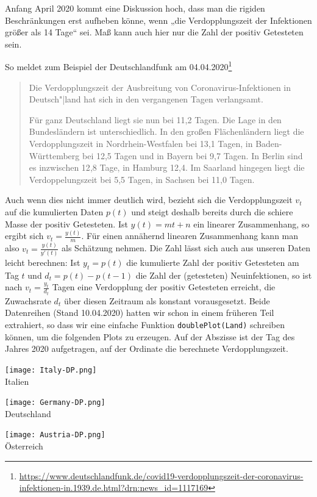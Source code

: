\documentclass[a4paper,11pt]{article}
\begin{document}
Anfang April 2020 kommt eine Diskussion hoch, dass man die rigiden
Beschränkungen erst aufheben könne, wenn „die Verdopplungszeit der Infektionen
größer als 14 Tage“ sei.  Maß kann auch hier nur die Zahl der positiv
Getesteten sein. 

So meldet zum Beispiel der Deutschlandfunk am 04.04.2020\footnote{\raggedright
  \url{https://www.deutschlandfunk.de/covid19-verdopplungszeit-der-coronavirus-infektionen-in.1939.de.html?drn:news_id=1117169}}
\begin{quote}
  Die Verdopplungszeit der Ausbreitung von Coronavirus-Infektionen in
  Deutsch"|land hat sich in den vergangenen Tagen verlangsamt.

  Für ganz Deutschland liegt sie nun bei 11{,}2 Tagen. Die Lage in den
  Bundesländern ist unterschiedlich. In den großen Flächenländern liegt die
  Verdopplungszeit in Nordrhein-Westfalen bei 13{,}1 Tagen, in
  Baden-Württemberg bei 12{,}5 Tagen und in Bayern bei 9{,}7 Tagen. In Berlin
  sind es inzwischen 12{,}8 Tage, in Hamburg 12{,}4. Im Saarland hingegen
  liegt die Verdoppelungszeit bei 5{,}5 Tagen, in Sachsen bei 11{,}0 Tagen.
\end{quote}
Auch wenn dies nicht immer deutlich wird, bezieht sich die Verdopplungszeit
$v_t$ auf die kumulierten Daten $p(t)$ und steigt deshalb bereits durch die
schiere Masse der positiv Getesteten.  Ist $y(t)=mt+n$ ein linearer
Zusammenhang, so ergibt sich $v_t=\frac{y(t)}{m}$. Für einen annähernd
linearen Zusammenhang kann man also $v_t=\frac{y(t)}{y'(t)}$ als Schätzung
nehmen.  Die Zahl lässt sich auch aus unseren Daten leicht berechnen: Ist
$y_t=p(t)$ die kumulierte Zahl der positiv Getesteten am Tag $t$ und
$d_t=p(t)-p(t-1)$ die Zahl der (getesteten) Neuinfektionen, so ist nach
$v_t=\frac{y_t}{d_t}$ Tagen eine Verdopplung der positiv Getesteten erreicht,
die Zuwachsrate $d_t$ über diesen Zeitraum als konstant vorausgesetzt.  Beide
Datenreihen (Stand 10.04.2020) hatten wir schon in einem früheren Teil
extrahiert, so dass wir eine einfache Funktion \texttt{doublePlot(Land)}
schreiben können, um die folgenden Plots zu erzeugen. Auf der Abszisse ist der
Tag des Jahres 2020 aufgetragen, auf der Ordinate die berechnete
Verdopplungszeit. 
\begin{center}  
  \begin{minipage}{.33\textwidth}\centering
    \texttt{[image: Italy-DP.png]}\\[1em] {Italien}
  \end{minipage}\hfill
  \begin{minipage}{.33\textwidth}\centering
    \texttt{[image: Germany-DP.png]}\\[1em] {Deutschland}
  \end{minipage}\hfill
  \begin{minipage}{.33\textwidth}\centering
    \texttt{[image: Austria-DP.png]}\\[1em] {Österreich}
  \end{minipage}
\end{center}
\end{document}
